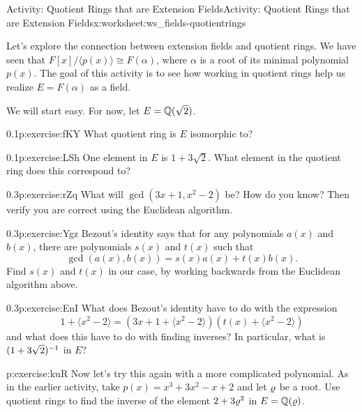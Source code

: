 \documentclass[11pt]{book}
\begin{document}
%
%
\typeout{************************************************}
\typeout{************************************************}
%
\begin{worksheet-subsection}{Activity: Quotient Rings that are Extension Fields}{}{Activity: Quotient Rings that are Extension Fields}{}{}{x:worksheet:ws_fields-quotientrings}
\begin{introduction}{}%
Let's explore the connection between extension fields and quotient rings. We have seen that \(F[x]/\langle p(x) \rangle \cong F(\alpha)\), where \(\alpha\) is a root of its minimal polynomial \(p(x)\).  The goal of this activity is to see how working in quotient rings help us realize \(E = F(\alpha)\) as a field.%
\par
We will start easy.  For now, let \(E = \mathbb{Q}(\sqrt{2})\).%
\end{introduction}%
\begin{divisionexercise}{1}{}{0.1}{p:exercise:fKY}%
What quotient ring is \(E\) isomorphic to?%
\end{divisionexercise}%
\begin{divisionexercise}{2}{}{0.1}{p:exercise:LSh}%
One element in \(E\) is \(1+3\sqrt{2}\).  What element in the quotient ring does this correspond to?%
\end{divisionexercise}%
\begin{divisionexercise}{3}{}{0.3}{p:exercise:rZq}%
What will \(\gcd(3x+1, x^2 - 2)\) be?  How do you know?  Then verify you are correct using the Euclidean algorithm.%
\end{divisionexercise}%
\clearpage
\begin{divisionexercise}{4}{}{0.3}{p:exercise:Ygz}%
Bezout's identity says that for any polynomials \(a(x)\) and \(b(x)\), there are polynomials \(s(x)\) and \(t(x)\) such that%
\begin{equation*}
\gcd(a(x), b(x)) = s(x)a(x) + t(x)b(x)\text{.}
\end{equation*}
Find \(s(x)\) and \(t(x)\) in our case, by working backwards from the Euclidean algorithm above.%
\end{divisionexercise}%
\begin{divisionexercise}{5}{}{0.3}{p:exercise:EnI}%
What does Bezout's identity have to do with the expression%
\begin{equation*}
1+\langle x^2 - 2\rangle = (3x+1 + \langle x^2 - 2\rangle)(t(x) + \langle x^2 - 2\rangle)
\end{equation*}
and what does this have to do with finding inverses?  In particular, what is \((1+3\sqrt{2})^{-1}\) in \(E\)?%
\end{divisionexercise}%
\begin{divisionexercise}{6}{}{}{p:exercise:kuR}%
Now let's try this again with a more complicated polynomial.  As in the earlier activity, take \(p(x) = x^3 + 3x^2 - x + 2\) and let \(\varrho\) be a root.  Use quotient rings to find the inverse of the element \(2 + 3\varrho^2\) in \(E = \mathbb{Q}(\varrho)\).%
\end{divisionexercise}%
\end{worksheet-subsection}
\restoregeometry
\end{document}
